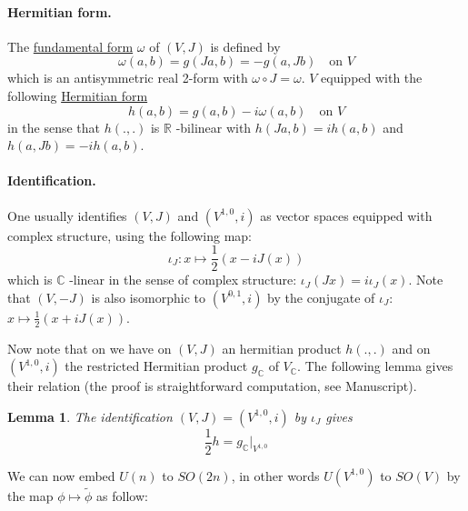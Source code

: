 \documentclass[11pt]{article}
\newtheorem{lemma}[theorem]{Lemma}
\begin{document}
\paragraph{Hermitian form.}
\label{sec:org4c5943d}
The \uline{fundamental form} \(\omega\) of \((V,J)\) is defined by
\[
\omega(a,b) = g(Ja,b) = -g(a, Jb) \quad \text{on } V
\]
which is an antisymmetric real 2-form with \(\omega\circ J = \omega\). \(V\) equipped with the following
\uline{Hermitian form}
\[
h(a,b) = g(a,b) - i\omega(a,b)  \quad \text{on } V
\]
in the sense that \(h(.,.)\) is \(\mathbb{R}\) -bilinear with \(h(Ja,b) = ih(a,b)\) and \(h(a,Jb) = -ih(a,b)\).

\paragraph{Identification.}
\label{sec:org2787d44}
One usually identifies \((V,J)\) and \((V^{1,0},i)\) as vector spaces equipped with complex structure,
using the following map:
\[
\iota_J: x \mapsto \frac{1}{2}(x - iJ(x))
\]
which is \(\mathbb{C}\) -linear in the sense of complex structure: \(\iota_J(Jx) = i\iota_J(x)\). Note
that \((V,-J)\) is also isomorphic to \((V^{0,1},i)\) by the conjugate of \(\iota_J\): \(x\mapsto
\frac{1}{2}(x + iJ(x))\).

Now note that on we have on \((V,J)\) an hermitian product \(h(.,.)\) and on \((V^{1,0},i)\) the restricted
Hermitian product \(g_{\mathbb{C}}\) of \(V_{\mathbb{C}}\). The following lemma gives their relation
(the proof is straightforward computation, see Manuscript).

\begin{lemma}
The identification \((V,J) = (V^{1,0},i)\) by \(\iota_J\) gives
\[
\frac{1}{2}h = g_\mathbb{C}|_{V^{1,0}}
\]
\end{lemma}


We can now embed \(U(n)\) to \(SO(2n)\), in other words \(U(V^{1,0})\) to \(SO(V)\) by the map
\(\phi\mapsto \tilde\phi\) as follow:
\end{document}
